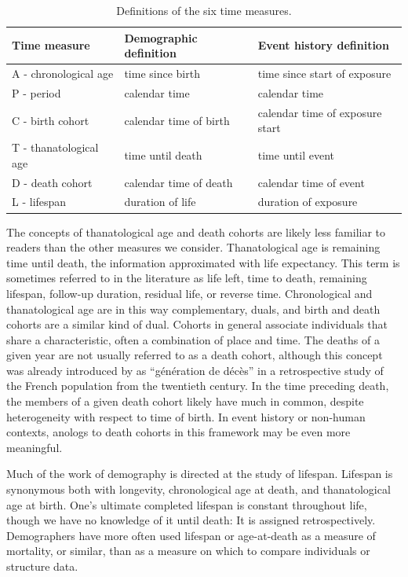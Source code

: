 \documentclass[12pt,oneside,a4paper]{article} %
\theoremstyle{definition}
\begin{document}
\FloatBarrier
\begin{table}[ht!]
\centering
\caption{Definitions of the six time measures.}
\label{tab:sixdefs}
\begin{adjustwidth}{0em}{0em}
\begin{tabular}{lll}
\hline 
\textbf{Time measure}	& \textbf{Demographic definition}	& \textbf{Event history definition}	\\ \hline 
A - chronological age 	& time since birth 			& time since start of exposure 		\\
P - period 		        & calendar time 			& calendar time				\\
C - birth cohort 	    & calendar time of birth 	& calendar time of exposure
start
\\
T - thanatological age 	& time until death 			& time until event			\\
D - death cohort	    & calendar time of death	& calendar time of event		\\
L - lifespan		    & duration of life			& duration of exposure			\\ \hline
\end{tabular}
\end{adjustwidth}
\end{table}

The concepts of thanatological age and death cohorts are likely less familiar to
readers than the other measures we consider. Thanatological age is
remaining time until death, the information approximated with life
expectancy. This term is sometimes referred to in the literature as life left,
time to death, remaining lifespan, follow-up duration, residual life, or
reverse time. Chronological and thanatological age are in this way
complementary, duals, and birth and death cohorts are a similar kind of dual.
Cohorts in general associate individuals that share a characteristic, often a combination of place and time. The deaths of a given year are not usually referred to as a death
cohort, although this concept was already introduced by \cite{brouard1986} as
``g\'en\'eration de d\'ec\`es'' in a retrospective study of the French
population from the twentieth century. In the time preceding death, the members of a given death cohort likely have much in common, despite heterogeneity with respect to time of birth. In event history or non-human contexts, anologs to death cohorts in this framework may be even more meaningful.

Much of the work of demography is directed at the study of lifespan. Lifespan is
synonymous both with longevity, chronological age at death, and thanatological
age at birth. One's ultimate completed lifespan is constant throughout life,
though we have no knowledge of it until death: It is assigned retrospectively.
Demographers have more often used lifespan or age-at-death as a measure of
mortality, or similar, than as a measure on which to compare individuals or
structure data.
\end{document}
